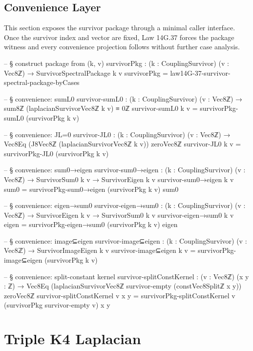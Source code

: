 \documentclass[11pt,a4paper]{book}
\def\texorpdfstring#1#2{#2}%
\begin{document}
\section{Convenience Layer}

This section exposes the survivor package through a minimal caller interface.
Once the survivor index and vector are fixed, Law 14G.37 forces the package witness and every convenience projection follows without further case analysis.

\begin{code}
-- § construct package from (k, v)
survivorPkg : (k : CouplingSurvivor) (v : Vec8ℤ) → SurvivorSpectralPackage k v
survivorPkg = law14G-37-survivor-spectral-package-byCases

-- § convenience: sumL0
survivor-sumL0 : (k : CouplingSurvivor) (v : Vec8ℤ) → sum8ℤ (laplacianSurvivorVec8ℤ k v) ≡ 0ℤ
survivor-sumL0 k v = survivorPkg-sumL0 (survivorPkg k v)

-- § convenience: JL=0
survivor-JL0 : (k : CouplingSurvivor) (v : Vec8ℤ) → Vec8Eq (J8Vec8ℤ (laplacianSurvivorVec8ℤ k v)) zeroVec8ℤ
survivor-JL0 k v = survivorPkg-JL0 (survivorPkg k v)

-- § convenience: sum0→eigen
survivor-sum0→eigen : (k : CouplingSurvivor) (v : Vec8ℤ) → SurvivorSum0 k v → SurvivorEigen k v
survivor-sum0→eigen k v sum0 = survivorPkg-sum0→eigen (survivorPkg k v) sum0

-- § convenience: eigen→sum0
survivor-eigen→sum0 : (k : CouplingSurvivor) (v : Vec8ℤ) → SurvivorEigen k v → SurvivorSum0 k v
survivor-eigen→sum0 k v eigen = survivorPkg-eigen→sum0 (survivorPkg k v) eigen

-- § convenience: image⊆eigen
survivor-image⊆eigen : (k : CouplingSurvivor) (v : Vec8ℤ) → SurvivorImageEigen k v
survivor-image⊆eigen k v = survivorPkg-image⊆eigen (survivorPkg k v)

-- § convenience: split-constant kernel
survivor-splitConstKernel : (v : Vec8ℤ) (x y : ℤ) →
  Vec8Eq (laplacianSurvivorVec8ℤ survivor-empty (constVec8Splitℤ x y)) zeroVec8ℤ
survivor-splitConstKernel v x y = survivorPkg-splitConstKernel {v} (survivorPkg survivor-empty v) x y
\end{code}


\chapter{Triple K\texorpdfstring{$_4$}{4} Laplacian}
\label{ch:triple-laplacian}
\end{document}
